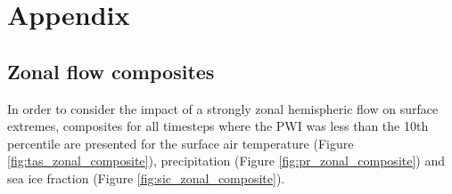 \appendix
\section{Appendix}\label{s:appendix}

\subsection{Zonal flow composites}\label{s:zonal_composites}

In order to consider the impact of a strongly zonal hemispheric flow on surface extremes, composites for all timesteps where the PWI was less than the 10th percentile are presented for the surface air temperature (Figure \ref{fig:tas_zonal_composite}), precipitation (Figure \ref{fig:pr_zonal_composite}) and sea ice fraction (Figure \ref{fig:sic_zonal_composite}).